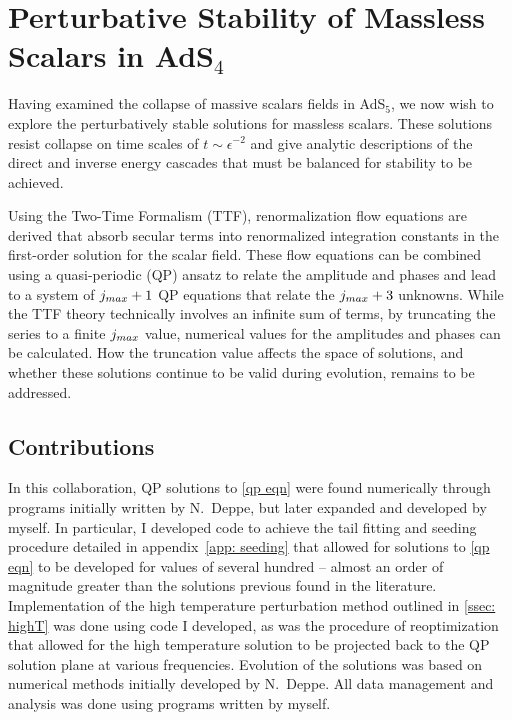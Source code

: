 \documentclass[../PhD.tex]{subfiles}
\begin{document}

\chapter{Perturbative Stability of Massless Scalars in AdS$_4$}

Having examined the collapse of massive scalars fields in AdS$_5$, we now wish to explore the perturbatively stable solutions for massless scalars. These solutions resist collapse on time scales of $t \sim \epsilon^{-2}$ and give analytic descriptions of the direct and inverse energy cascades that must be balanced for stability to be achieved. 

Using the Two-Time Formalism (TTF), renormalization flow equations are derived that absorb secular terms into renormalized integration constants in the first-order solution for the scalar field. These flow equations can be combined using a quasi-periodic (QP) ansatz to relate the amplitude and phases and lead to a system of $j_{max} + 1$ QP equations that relate the $j_{max} + 3$ unknowns. While the TTF theory technically involves an infinite sum of terms, by truncating the series to a finite $j_{max}$ value, numerical values for the amplitudes and phases can be calculated. How the truncation value affects the space of solutions, and whether these solutions continue to be valid during evolution, remains to be addressed.


\section{Contributions}

In this collaboration, QP solutions to \eqref{qp eqn} were found numerically through programs initially written by N.~Deppe, but later expanded and developed by myself. In particular, I developed code to achieve the tail fitting and seeding procedure detailed in appendix~\ref{app: seeding} that allowed for solutions to \eqref{qp eqn} to be developed for \jm values of several hundred -- almost an order of magnitude greater than the solutions previous found in the literature. Implementation of the high temperature perturbation method outlined in \ref{ssec: highT} was done using code I developed, as was the procedure of reoptimization that allowed for the high temperature solution to be projected back to the QP solution plane at various frequencies. Evolution of the solutions was based on numerical methods initially developed by N.~Deppe. All data management and analysis was done using programs written by myself.
\end{document}
